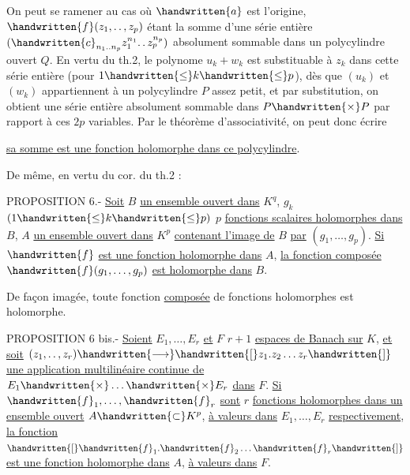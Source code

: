 On peut se ramener au cas où $\handwritten{a}$ est l'origine, $\handwritten{f}(z_1,\ldotp\ldotp,z_p)$ étant la somme d'une série entière $(\handwritten{c}_{n_1\ldotp\ldotp n_p}z_1^{n_1}\ldotp\ldotp z_p^{n_p})$ absolument sommable dans un polycylindre ouvert $Q$. En vertu du th.2, le polynome $u_k+w_k$ est substituable à $z_k$ dans cette série entière (pour $1\handwritten{\leq}k\handwritten{\leq}p$), dès que $(u_k)$ et $(w_k)$ appartiennent à un polycylindre $P$ assez petit, et par substitution, on obtient une série entière absolument sommable dans $P\handwritten{\times}P$ par rapport à ces $2p$ variables. Par le théorème d'associativité, on peut donc écrire


\uline{sa somme est une fonction holomorphe dans ce polycylindre}.

De même, en vertu du cor. du th.2 :

PROPOSITION 6.- \uline{Soit} $B$ \uline{un ensemble ouvert dans} ${K}^{q}$, $g_k$ $(1\handwritten{\leq}k\handwritten{\leq}p)$ $p$ \uline{fonctions scalaires holomorphes dans} $B$, $A$ \uline{un ensemble ouvert dans} $K^{p}$ \uline{contenant l'image de} $B$ \uline{par} $(g_1,\ldots,g_p)$. \uline{Si} $\handwritten{f}$ \uline{est une fonction holomorphe dans} $A$, \uline{la fonction composée} $\handwritten{f}(g_1,\ldots,g_p)$ \uline{est holomorphe dans} $B$.

De façon imagée, toute fonction \uline{composée} de fonctions holomorphes est holomorphe.

PROPOSITION 6 bis.- \uline{Soient} $E_1,\ldots,E_r$ \uline{et} $F$ $r+1$ \uline{espaces de Banach sur} $K$, \uline{et soit} $(z_1,\ldotp\ldotp,z_r)\handwritten{\longrightarrow}\handwritten{[}z_1.z_2\ldots z_r\handwritten{]}$ \uline{une application multilinéaire continue de} $E_1\handwritten{\times}\ldots\handwritten{\times}E_r$ \uline{dans} $F$. \uline{Si} $\handwritten{f}_1,\ldots,\handwritten{f}_r$ \uline{sont} $r$ \uline{fonctions holomorphes dans un ensemble ouvert} $A\handwritten{\subset}K^p$, \uline{à valeurs dans} $E_1,\ldots,E_r$ \uline{respectivement}, \uline{la fonction} $\handwritten{[}\handwritten{f}_1.\handwritten{f}_2\ldots\handwritten{f}_r\handwritten{]}$ \uline{est une fonction holomorphe dans} $A$, \uline{à valeurs dans} $F$.

